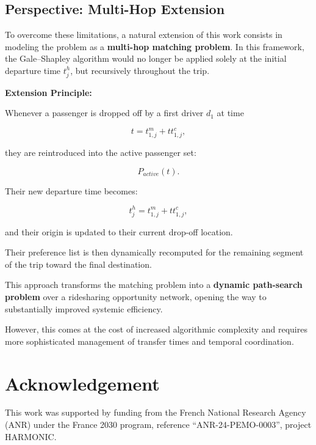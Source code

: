 \documentclass[11pt,a4paper]{article}
\begin{document}
\subsection{Perspective: Multi-Hop Extension}

To overcome these limitations, a natural extension of this work consists in modeling the problem as a \textbf{multi-hop matching problem}. In this framework, the Gale--Shapley algorithm would no longer be applied solely at the initial departure time $t_j^h$, but recursively throughout the trip.

\textbf{Extension Principle:}

Whenever a passenger is dropped off by a first driver $d_1$ at time

$$
t=t_{1,j}^m+tt_{1,j}^c,
$$

they are reintroduced into the active passenger set:

$$
P_{active}(t).
$$

Their new departure time becomes:

$$
t_j^h=t_{1,j}^m+tt_{1,j}^c,
$$

and their origin is updated to their current drop-off location.

Their preference list is then dynamically recomputed for the remaining segment of the trip toward the final destination.

This approach transforms the matching problem into a \textbf{dynamic path-search problem} over a ridesharing opportunity network, opening the way to substantially improved systemic efficiency.

However, this comes at the cost of increased algorithmic complexity and requires more sophisticated management of transfer times and temporal coordination.






\section*{Acknowledgement}
This work was supported by funding from the French National Research Agency (ANR) under the France 2030 program, reference ``ANR-24-PEMO-0003'', project HARMONIC.
\end{document}
